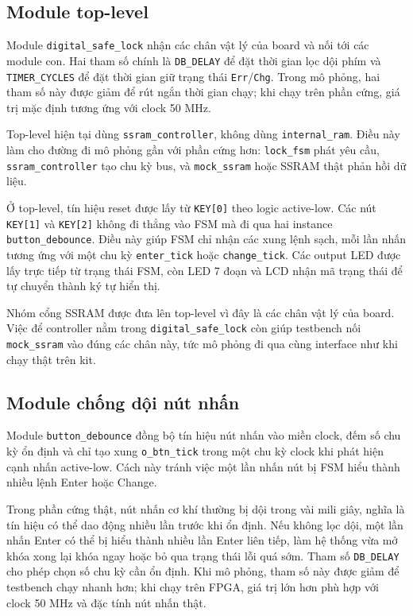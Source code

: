 \documentclass[13pt,a4paper]{article}
\begin{document}
\subsection{Module top-level}
Module \texttt{digital\_safe\_lock} nhận các chân vật lý của board và nối tới các module con. Hai tham số chính là \texttt{DB\_DELAY} để đặt thời gian lọc dội phím và \texttt{TIMER\_CYCLES} để đặt thời gian giữ trạng thái \texttt{Err}/\texttt{Chg}. Trong mô phỏng, hai tham số này được giảm để rút ngắn thời gian chạy; khi chạy trên phần cứng, giá trị mặc định tương ứng với clock 50 MHz.

Top-level hiện tại dùng \texttt{ssram\_controller}, không dùng \texttt{internal\_ram}. Điều này làm cho đường đi mô phỏng gần với phần cứng hơn: \texttt{lock\_fsm} phát yêu cầu, \texttt{ssram\_controller} tạo chu kỳ bus, và \texttt{mock\_ssram} hoặc SSRAM thật phản hồi dữ liệu.

Ở top-level, tín hiệu reset được lấy từ \texttt{KEY[0]} theo logic active-low. Các nút \texttt{KEY[1]} và \texttt{KEY[2]} không đi thẳng vào FSM mà đi qua hai instance \texttt{button\_debounce}. Điều này giúp FSM chỉ nhận các xung lệnh sạch, mỗi lần nhấn tương ứng với một chu kỳ \texttt{enter\_tick} hoặc \texttt{change\_tick}. Các output LED được lấy trực tiếp từ trạng thái FSM, còn LED 7 đoạn và LCD nhận mã trạng thái để tự chuyển thành ký tự hiển thị.

Nhóm cổng SSRAM được đưa lên top-level vì đây là các chân vật lý của board. Việc để controller nằm trong \texttt{digital\_safe\_lock} còn giúp testbench nối \texttt{mock\_ssram} vào đúng các chân này, tức mô phỏng đi qua cùng interface như khi chạy thật trên kit.

\subsection{Module chống dội nút nhấn}
Module \texttt{button\_debounce} đồng bộ tín hiệu nút nhấn vào miền clock, đếm số chu kỳ ổn định và chỉ tạo xung \texttt{o\_btn\_tick} trong một chu kỳ clock khi phát hiện cạnh nhấn active-low. Cách này tránh việc một lần nhấn nút bị FSM hiểu thành nhiều lệnh Enter hoặc Change.

Trong phần cứng thật, nút nhấn cơ khí thường bị dội trong vài mili giây, nghĩa là tín hiệu có thể dao động nhiều lần trước khi ổn định. Nếu không lọc dội, một lần nhấn Enter có thể bị hiểu thành nhiều lần Enter liên tiếp, làm hệ thống vừa mở khóa xong lại khóa ngay hoặc bỏ qua trạng thái lỗi quá sớm. Tham số \texttt{DB\_DELAY} cho phép chọn số chu kỳ cần ổn định. Khi mô phỏng, tham số này được giảm để testbench chạy nhanh hơn; khi chạy trên FPGA, giá trị lớn hơn phù hợp với clock 50 MHz và đặc tính nút nhấn thật.
\end{document}
